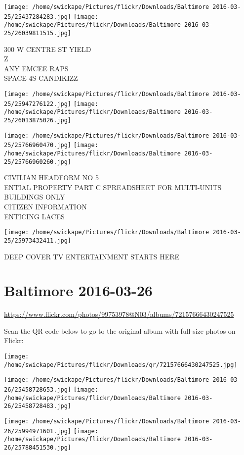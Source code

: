 \documentclass[10pt,letterpaper]{article}
\begin{document}
\texttt{[image: /home/swickape/Pictures/flickr/Downloads/Baltimore 2016-03-25/25437284283.jpg]}
\texttt{[image: /home/swickape/Pictures/flickr/Downloads/Baltimore 2016-03-25/26039811515.jpg]}

300 W CENTRE ST YIELD\\
Z\\
ANY EMCEE RAPS\\
SPACE 4S CANDIKIZZ
\pagebreak

\texttt{[image: /home/swickape/Pictures/flickr/Downloads/Baltimore 2016-03-25/25947276122.jpg]}
\texttt{[image: /home/swickape/Pictures/flickr/Downloads/Baltimore 2016-03-25/26013875026.jpg]}

\texttt{[image: /home/swickape/Pictures/flickr/Downloads/Baltimore 2016-03-25/25766960470.jpg]}
\texttt{[image: /home/swickape/Pictures/flickr/Downloads/Baltimore 2016-03-25/25766960260.jpg]}

CIVILIAN HEADFORM NO 5\\
ENTIAL PROPERTY PART C SPREADSHEET FOR MULTI{-}UNITS BUILDINGS ONLY\\
CITIZEN INFORMATION\\
ENTICING LACES
\pagebreak

\texttt{[image: /home/swickape/Pictures/flickr/Downloads/Baltimore 2016-03-25/25973432411.jpg]}

DEEP COVER TV ENTERTAINMENT STARTS HERE
\pagebreak

\section*{Baltimore 2016-03-26}

\url{https://www.flickr.com/photos/99753978@N03/albums/72157666430247525}

Scan the QR code below to go to the original album with full-size photos on Flickr:

\texttt{[image: /home/swickape/Pictures/flickr/Downloads/qr/72157666430247525.jpg]}
\pagebreak

\texttt{[image: /home/swickape/Pictures/flickr/Downloads/Baltimore 2016-03-26/25458728653.jpg]}
\texttt{[image: /home/swickape/Pictures/flickr/Downloads/Baltimore 2016-03-26/25458728483.jpg]}

\texttt{[image: /home/swickape/Pictures/flickr/Downloads/Baltimore 2016-03-26/25994971601.jpg]}
\texttt{[image: /home/swickape/Pictures/flickr/Downloads/Baltimore 2016-03-26/25788451530.jpg]}
\end{document}
